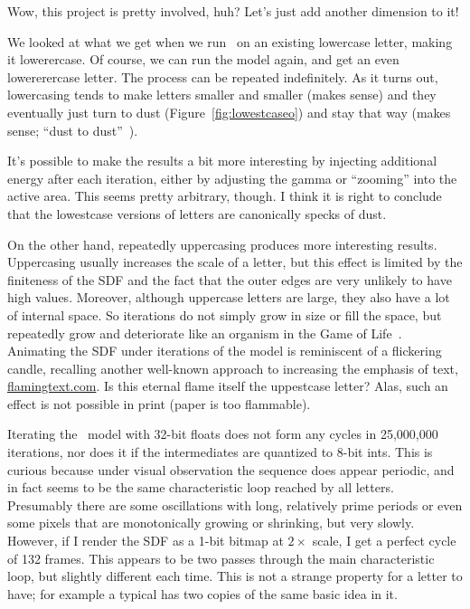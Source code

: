\documentclass[twocolumn]{article}
\begin{document}
Wow, this project is pretty involved, huh? Let's just add another
dimension to it!

We looked at what we get when we run \makelowercase\ on an existing
lowercase letter, making it lowerercase. Of course, we can run the
model again, and get an even lowererercase letter. The process can be
repeated indefinitely. As it turns out, lowercasing tends to make
letters smaller and smaller (makes sense) and they eventually just
turn to dust (Figure~\ref{fig:lowestcaseo}) and stay that way (makes
sense; ``dust to dust''~\cite{commonprayerburial}). 

It's possible to make the results a bit more interesting by injecting
additional energy after each iteration, either by adjusting the gamma
or ``zooming'' into the active area. This seems pretty arbitrary,
though. I think it is right to conclude that the lowestcase versions
of letters are canonically specks of dust.

On the other hand, repeatedly uppercasing produces more interesting
results. Uppercasing usually increases the scale of a letter, but this
effect is limited by the finiteness of the SDF and the fact that the
outer edges are very unlikely to have high values. Moreover, although
uppercase letters are large, they also have a lot of internal space.
So iterations do not simply grow in size or fill the space, but
repeatedly grow and deteriorate like an organism in the Game of
Life~\cite{games1970fantastic}. Animating the SDF under iterations of
the model is reminiscent of a flickering candle, recalling another
well-known approach to increasing the emphasis of text,
\url{flamingtext.com}. Is this eternal flame itself the uppestcase
letter? Alas, such an effect is not possible in print (paper is too
flammable).

Iterating the \makeuppercase\ model with 32-bit floats does not form
any cycles in 25,000,000 iterations, nor does it if the intermediates
are quantized to 8-bit ints. This is curious because under visual
observation the sequence does appear periodic, and in fact seems to be
the same characteristic loop reached by all letters. Presumably there
are some oscillations with long, relatively prime periods or even some
pixels that are monotonically growing or shrinking, but very slowly.
However, if I render the SDF as a 1-bit bitmap at $2\times$ scale, I
get a perfect cycle of 132 frames. This appears to be two passes
through the main characteristic loop, but slightly different each
time. This is not a strange property for a letter to have; for example
a typical  has two copies of the same basic idea in it.
\end{document}
